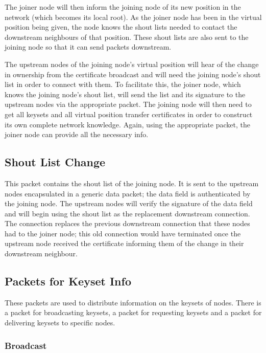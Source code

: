 \documentclass[ %
                    author={Luke Murray},
                supervisor={Dr. Simon Hollis},
                     title={Shadow Peer-to-Peer Networks},
                  subtitle={},
                    degree={MEng},
                      year={2013} ]{thesis}
\begin{document}
The joiner node will then inform the joining node of its new position in the network (which becomes its local root). As the joiner node has been in the virtual position being given, the node knows the shout lists needed to contact the downstream neighbours of that position. These shout lists are also sent to the joining node so that it can send packets downstream. %

The upstream nodes of the joining node's virtual position will hear of the change in ownership from the certificate broadcast and will need the joining node's shout list in order to connect with them. To facilitate this, the joiner node, which knows the joining node's shout list, will send the list and its signature to the upstream nodes via the appropriate packet. The joining node will then need to get all keysets and all virtual position transfer certificates in order to construct its own complete network knowledge. Again, using the appropriate packet, the joiner node can provide all the necessary info.

\subsection{Shout List Change}

This packet contains the shout list of the joining node. It is sent to the upstream nodes encapsulated in a generic data packet; the data field is authenticated by the joining node. The upstream nodes will verify the signature of the data field and will begin using the shout list as the replacement downstream connection. The connection replaces the previous downstream connection that these nodes had to the joiner node; this old connection would have terminated once the upstream node received the certificate informing them of the change in their downstream neighbour.

\subsection{Packets for Keyset Info}
\label{keysetinfo}

These packets are used to distribute information on the keysets of nodes. There is a packet for broadcasting keysets, a packet for requesting keysets and a packet for delivering keysets to specific nodes.

\subsubsection{Broadcast}
\end{document}
